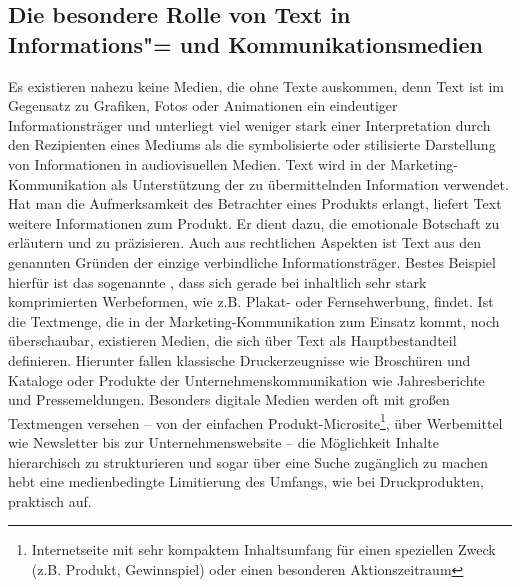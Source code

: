 \subsection{Die besondere Rolle von Text in Informations"= und Kommunikationsmedien}\label{l:besondererolle}

Es existieren nahezu keine Medien, die ohne Texte auskommen, denn Text ist im Gegensatz zu Grafiken, Fotos oder Animationen ein eindeutiger Informationsträger und unterliegt viel weniger stark einer Interpretation durch den Rezipienten eines Mediums als die symbolisierte oder stilisierte Darstellung von Informationen in audiovisuellen Medien. Text wird in der Marketing-Kommunikation als Unterstützung der zu übermittelnden Information verwendet. Hat man die Aufmerksamkeit des Betrachter eines Produkts erlangt, liefert Text weitere Informationen zum Produkt. Er dient dazu, die emotionale Botschaft zu erläutern und zu präzisieren. Auch aus rechtlichen Aspekten ist Text aus den genannten Gründen der einzige verbindliche Informationsträger. Bestes Beispiel hierfür ist das sogenannte , dass sich gerade bei inhaltlich sehr stark komprimierten Werbeformen, wie z.B. Plakat- oder Fernsehwerbung, findet. Ist die Textmenge, die in der Marketing-Kommunikation zum Einsatz kommt, noch überschaubar, existieren Medien, die sich über Text als Hauptbestandteil definieren. Hierunter fallen klassische Druckerzeugnisse wie Broschüren und Kataloge oder Produkte der Unternehmenskommunikation wie Jahresberichte und Pressemeldungen. Besonders digitale Medien werden oft mit großen Textmengen versehen -- von der einfachen Produkt-Microsite\footnote{Internetseite mit sehr kompaktem Inhaltsumfang für einen speziellen Zweck (z.B. Produkt, Gewinnspiel) oder einen besonderen Aktionszeitraum}, über Werbemittel wie Newsletter bis zur Unternehmenswebsite -- die Möglichkeit Inhalte hierarchisch zu strukturieren und sogar über eine Suche zugänglich zu machen hebt eine medienbedingte Limitierung des Umfangs, wie bei Druckprodukten, praktisch auf.

